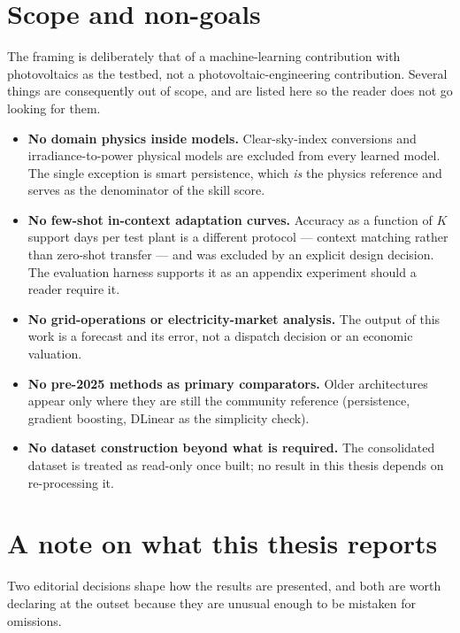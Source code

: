 \section{Scope and non-goals}
\label{sec:scope}

The framing is deliberately that of a machine-learning contribution with photovoltaics as
the testbed, not a photovoltaic-engineering contribution. Several things are consequently
out of scope, and are listed here so the reader does not go looking for them.

\begin{itemize}
  \item \textbf{No domain physics inside models.} Clear-sky-index conversions and
    irradiance-to-power physical models are excluded from every learned model. The single
    exception is smart persistence, which \emph{is} the physics reference and serves as the
    denominator of the skill score.
  \item \textbf{No few-shot in-context adaptation curves.} Accuracy as a function of $K$
    support days per test plant is a different protocol --- context matching rather than
    zero-shot transfer --- and was excluded by an explicit design decision. The evaluation
    harness supports it as an appendix experiment should a reader require it.
  \item \textbf{No grid-operations or electricity-market analysis.} The output of this work
    is a forecast and its error, not a dispatch decision or an economic valuation.
  \item \textbf{No pre-2025 methods as primary comparators.} Older architectures appear
    only where they are still the community reference (persistence, gradient boosting,
    DLinear as the simplicity check).
  \item \textbf{No dataset construction beyond what is required.} The consolidated dataset
    is treated as read-only once built; no result in this thesis depends on re-processing
    it.
\end{itemize}

\section{A note on what this thesis reports}
\label{sec:reporting-stance}

Two editorial decisions shape how the results are presented, and both are worth declaring at
the outset because they are unusual enough to be mistaken for omissions.

